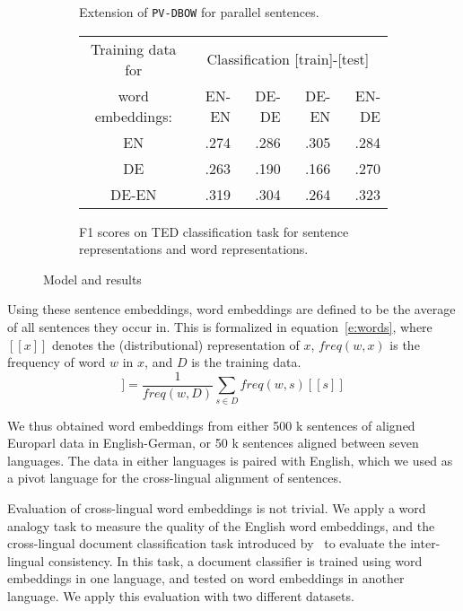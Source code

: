 \documentclass[a4paper,11pt]{article}
\begin{document}
\begin{figure}\center
\begin{subfigure}{.35\linewidth}
\center

\caption{Extension of {\tt PV-DBOW} for parallel sentences.}
\label{f:model}
\end{subfigure}
\begin{subfigure}{.64\linewidth}
\flushright
\begin{tabular}{c | r r r r }
Training data	for	&	\multicolumn{4}{c}{Classification [train]-[test]}	\\
word 	embeddings:	&EN-EN	&DE-DE	&DE-EN	&EN-DE		\\\hline
EN			&.274		&.286		&.305		&.284		\\
DE			&.263		&.190		&.166		&.270		\\
DE-EN			&.319		&.304		&.264		&.323		\\
\end{tabular}
\caption{F1 scores on TED classification task for sentence representations and word representations.}
\label{t:dbow_mono_bi}
\end{subfigure}
\caption{Model and results}
\end{figure}


Using these sentence embeddings, word embeddings are defined to be the average of all sentences they occur in. This is  formalized in equation~\ref{e:words}, where $[\![ x ]\!]$ denotes the (distributional) representation of $x$, $freq(w,x)$ is the frequency of word $w$ in $x$, and $D$ is the training data.
\begin{equation}
[\![ w ]\!] =\frac{1}{freq(w,D)}\sum_{s\in D}freq(w,s) [\![ s ]\!]
\label{e:words}
\end{equation}

We thus obtained word embeddings from either 500 k sentences of aligned Europarl data in English-German, or 50 k sentences aligned between seven languages. The data in either languages is paired with English, which we used as a pivot language for the cross-lingual alignment of sentences.

Evaluation of cross-lingual word embeddings is not trivial. We apply a word analogy task to measure the quality of the English word embeddings, and the cross-lingual document classification task introduced by~\cite{klementiev2012inducing} to evaluate the inter-lingual consistency. In this task, a document classifier is trained using word embeddings in one language, and tested on word embeddings in another language. We apply this evaluation with two different datasets.
\end{document}
